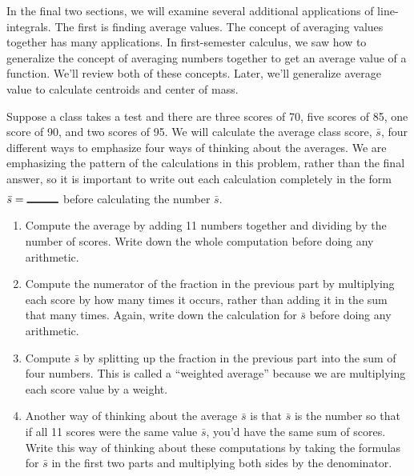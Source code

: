 In the final two sections, we will examine several additional applications of line-integrals. The first is finding average values. The concept of averaging values together has many applications.  In first-semester calculus, we saw how to generalize the concept of averaging numbers together to get an average value of a function.  We'll review both of these concepts. Later, we'll generalize average value to calculate centroids and center of mass.

\begin{problem}\label{average value methods}
  Suppose a class takes a test and there are three scores of 70, five scores of 85, one score of 90, and two scores of 95.  We will calculate the average class score, $\bar s$, four different ways to emphasize four ways of thinking about the averages.  We are emphasizing the pattern of the calculations in this problem, rather than the final answer, so it is important to write out each calculation completely in the form $\bar s = \blank{1cm}$ before calculating the number $\bar s$.
  \begin{enumerate}
  \item {}%
 Compute the average by adding 11 numbers together and dividing by the number of scores.  Write down the whole computation before doing any arithmetic.
  \item {}%
Compute the numerator of the fraction in the previous part by multiplying each score by how many times it occurs, rather than adding it in the sum that many times.  Again, write down the calculation for $\bar s$ before doing any arithmetic.
  \item {}%
Compute $\bar s$ by splitting up the fraction in the previous part into the sum of four numbers.  This is called a ``weighted average'' because we are multiplying each score value by a weight.
  \item {}%
Another way of thinking about the average $\bar s$ is that $\bar s$ is the number so that if all 11 scores were the same value $\bar s$, you'd have the same sum of scores.  Write this way of thinking about these computations by taking the formulas for $\bar s$ in the first two parts and multiplying both sides by the denominator.
  \end{enumerate}
\end{problem}

